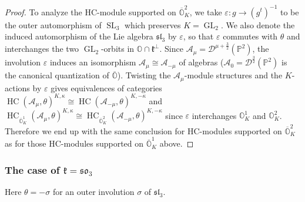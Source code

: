\documentclass[12pt]{amsart}
\newcommand{\A}{\mathcal{A}}
\newcommand{\Orb}{\mathbb{O}}
\newcommand{\kf}{\mathfrak{k}}
\newcommand{\HC}{\operatorname{HC}}
\newcommand{\SL}{\operatorname{SL}}
\newcommand{\slf}{\mathfrak{sl}}
\theoremstyle{definition}
\numberwithin{equation}{section}
\begin{document}
\begin{proof}
To analyze the HC-module supported on $\overline{\Orb}^2_K$, we take $\varepsilon: g \to (g^t)^{-1}$ to be the outer automorphism of $\SL_3$ which preserves $K=\operatorname{GL}_2$. We also denote the induced automorphism of the Lie algebra $\slf_3$ by $\varepsilon$, so that $\varepsilon$ commutes with $\theta$ and interchanges the two $\operatorname{GL}_2$-orbits in $\Orb\cap \kf^\perp$. Since  $\A_\mu = \mathscr{D}^{\mu + \frac{3}{2}}(\mathbb{P}^2)$, the involution $\varepsilon$ induces an isomorphism $\A_\mu \cong \A_{-\mu}$ of algebras ($\A_0 = \mathscr{D}^{ \frac{3}{2}}(\mathbb{P}^2)$ is the canonical quantization of $\overline{\Orb}$). Twisting the $\A_\mu$-module structures and the $K$-actions by $\varepsilon$ gives equivalences of categories $\HC(\A_\mu,\theta)^{K,\kappa} \cong \HC(\A_{-\mu},\theta)^{K,-\kappa}$ and $\HC_{\overline{\Orb}^1_K}(\A_\mu,\theta)^{K,\kappa} \cong \HC_{\overline{\Orb}^2_K}(\A_{-\mu},\theta)^{K,-\kappa}$ since $\varepsilon$ interchanges $\Orb^1_K$ and $\Orb^2_K$. Therefore we end up with the same conclusion for HC-modules supported on $\overline{\Orb}^2_K$ as for those  HC-modules supported on $\overline{\Orb}^1_K$  above.
\end{proof}

\subsubsection{The case of $\kf=\mathfrak{so}_3$}\label{SS:sl3_so3}
Here $\theta=-\sigma$ for an outer involution $\sigma$ of $\mathfrak{sl}_3$.
\end{document}
